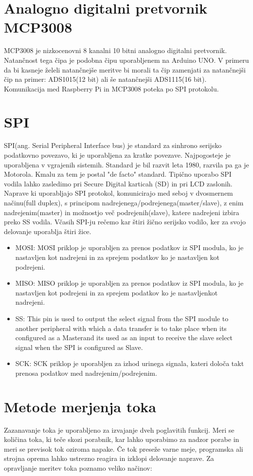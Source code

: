 \documentclass[12pt,a4paper,titlepage,openany]{report}
\begin{document}
\section{Analogno digitalni pretvornik MCP3008}
MCP3008 je nizkocenovni 8 kanalni 10 bitni analogno digitalni pretvornik. Natančnost tega čipa je podobna čipu uporabljenem na Arduino UNO. V primeru da bi kasneje želeli natančnejše meritve bi morali ta čip zamenjati za natančnejši čip na primer: ADS1015(12 bit) ali še natančnejši ADS1115(16 bit). Komunikacija med Raspberry Pi in MCP3008 poteka po SPI protokolu.

\section{SPI}
SPI(ang. Serial Peripheral Interface bus) je standard za sinhrono serijsko podatkovno povezavo, ki je uporabljena za kratke povezave. Najpogosteje je uporabljena v vgrajenih sistemih. Standard je bil razvit leta 1980, razvila pa ga je Motorola. Kmalu za tem je postal "de facto" standard. Tipično uporabo SPI vodila lahko zasledimo pri Secure Digital karticah (SD) in pri LCD zaslonih. Naprave ki uporabljajo SPI protokol, komunicirajo med seboj v dvosmernem načinu(full duplex), s principom nadrejenega/podrejenega(master/slave), z enim nadrejenim(master) in možnostjo več podrejenih(slave), katere nadrejeni izbira preko SS vodila. Včasih SPI-ju rečemo kar štiri žično serijsko vodilo, ker za svojo delovanje uporablja štiri žice.

\begin{itemize}
\item MOSI: MOSI priklop je uporabljen za prenos podatkov iz SPI modula, ko je nastavljen kot nadrejeni in za sprejem podatkov ko je nastavljen kot podrejeni.
\item MISO: MISO priklop je uporabljen za prenos podatkov iz SPI modula, ko je nastavljen kot podrejeni in za sprejem podatkov ko je nastavljenkot nadrejeni.
\item SS: This pin is used to output the select signal from the SPI module to another peripheral with which a data transfer is to take place when its configured as a Masterand its used as an input to receive the slave select signal when the SPI is configured as Slave.
\item SCK: SCK priklop je uporabljen za izhod urinega signala, kateri določa takt prenosa podatkov med nadrejenim/podrejenim.
\end{itemize}

\section{Metode merjenja toka}
Zazanavanje toka je uporabljeno za izvajanje dveh poglavitih funkcij. Meri se količina toka, ki teče skozi porabnik, kar lahko uporabimo za nadzor porabe in meri se previsok tok oziroma napake. Če tok preseže varne meje, programska ali strojna oprema lahko ustrezno reagira in izklopi delovanje naprave. Za opravljanje meritev toka poznamo veliko načinov:
\end{document}
